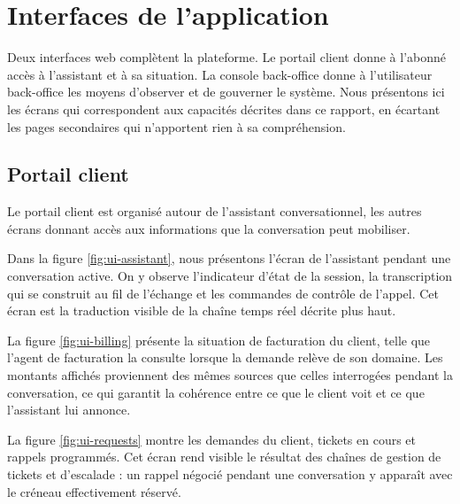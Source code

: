 \section{Interfaces de l'application}

Deux interfaces web complètent la plateforme. Le portail client donne à l'abonné accès à l'assistant et à sa situation. La console back-office donne à l'utilisateur back-office les moyens d'observer et de gouverner le système. Nous présentons ici les écrans qui correspondent aux capacités décrites dans ce rapport, en écartant les pages secondaires qui n'apportent rien à sa compréhension.

\subsection{Portail client}

Le portail client est organisé autour de l'assistant conversationnel, les autres écrans donnant accès aux informations que la conversation peut mobiliser.

Dans la figure \ref{fig:ui-assistant}, nous présentons l'écran de l'assistant pendant une conversation active. On y observe l'indicateur d'état de la session, la transcription qui se construit au fil de l'échange et les commandes de contrôle de l'appel. Cet écran est la traduction visible de la chaîne temps réel décrite plus haut.


La figure \ref{fig:ui-billing} présente la situation de facturation du client, telle que l'agent de facturation la consulte lorsque la demande relève de son domaine. Les montants affichés proviennent des mêmes sources que celles interrogées pendant la conversation, ce qui garantit la cohérence entre ce que le client voit et ce que l'assistant lui annonce.


La figure \ref{fig:ui-requests} montre les demandes du client, tickets en cours et rappels programmés. Cet écran rend visible le résultat des chaînes de gestion de tickets et d'escalade : un rappel négocié pendant une conversation y apparaît avec le créneau effectivement réservé.

